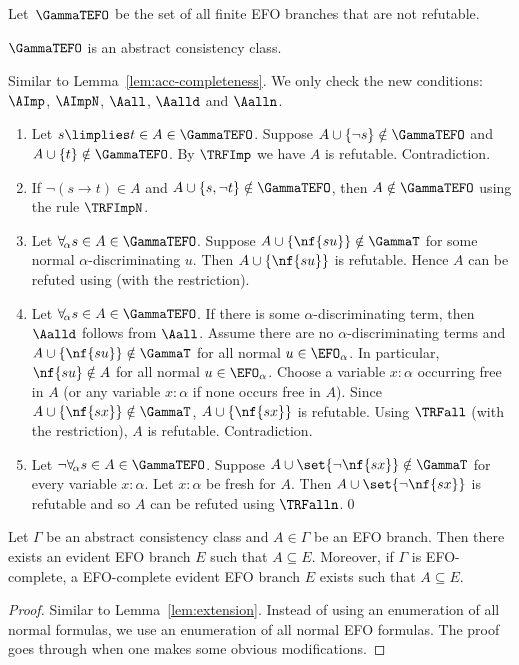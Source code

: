 Let~\emph{$\GammaTEFO$} be the
set of all finite EFO branches that are not refutable.
\begin{lem}
  \label{lem:acc-efo-completeness}
  $\GammaTEFO$ is an abstract consistency class.
\end{lem}
\proof  Similar to Lemma~\ref{lem:acc-completeness}.
We only check the new conditions: $\AImp$, $\AImpN$, $\Aall$,
  $\Aalld$ and $\Aalln$.
\begin{enumerate}[\AImpN]
\item[{\AImp}] Let $s\limplies t\in A\in \GammaTEFO$.
  Suppose $A\cup\{\neg s\}\notin\GammaTEFO$ and $A\cup\{t\}\notin\GammaTEFO$.
  By $\TRFImp$ we have $A$ is refutable.  Contradiction.
\item[{\AImpN}] If $\neg(s\to t)\in A$ and $A\cup\{s,\neg t\}\notin\GammaTEFO$,
  then $A\notin\GammaTEFO$ using the rule $\TRFImpN$.
\item[{\Aall}] Let $\forall_{\!\alpha} s\in A\in\GammaTEFO$.
  Suppose $A\cup\{\nf{su}\}\notin\GammaT$ for some normal $\alpha$-discriminating $u$.
Then $A\cup\{\nf{su}\}$ is refutable.
  Hence $A$ can be refuted using \TRFall (with the restriction).
\item[{\Aalld}] Let $\forall_{\!\alpha} s\in A\in\GammaTEFO$.
  If there is some $\alpha$-discriminating term, then $\Aalld$ follows from $\Aall$.
  Assume there are no $\alpha$-discriminating terms
  and $A\cup\{\nf{su}\}\notin\GammaT$ for all normal $u\in\EFO_\alpha$.
  In particular, $\nf{su}\notin A$ for all normal $u\in\EFO_\alpha$.
  Choose a variable $x:\alpha$ occurring free in $A$ (or any variable $x:\alpha$
  if none occurs free in $A$).
  Since $A\cup\{\nf{sx}\}\notin\GammaT$, $A\cup\{\nf{sx}\}$ is refutable.
  Using $\TRFall$ (with the restriction), $A$ is refutable.  Contradiction. \item[{\Aalln}] Let $\neg\forall_{\!\alpha} s\in A\in\GammaTEFO$.  Suppose
  $A\cup\set{\neg\nf{sx}}\notin\GammaT$ for every variable $x:\alpha$.
  Let $x:\alpha$ be fresh for $A$.
  Then $A\cup\set{\neg\nf{sx}}$ is refutable
  and so $A$ can be refuted using $\TRFalln$.\qed
\end{enumerate}

\begin{lem}
  \label{lem:efo-extension}
  Let $\Gamma$ be an abstract consistency class and
  $A\in\Gamma$ be an EFO branch.  Then there exists an evident EFO branch
  $E$ such that $A\subseteq E$.  Moreover, if $\Gamma$
  is EFO-complete, a EFO-complete evident EFO branch $E$ exists
  such that $A\subseteq E$.
\end{lem}
\begin{proof}  Similar to Lemma~\ref{lem:extension}.  Instead of using an enumeration of all normal formulas,
  we use an enumeration of all normal EFO formulas.  The proof goes through when one makes
  some obvious modifications.
\end{proof}

